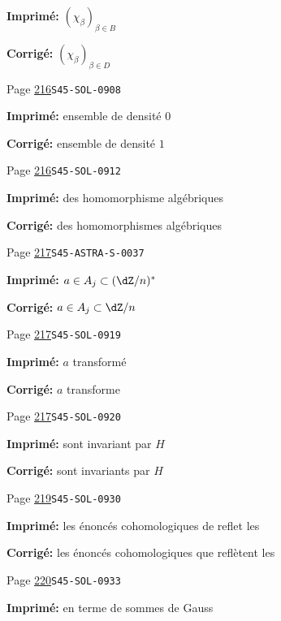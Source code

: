 \documentclass[oneside]{book}
\theoremstyle{sga-source}
\theoremstyle{sga-source-dash}
\theoremstyle{sga-source-dotdash}
\theoremstyle{sga-source-number-note-dash}
\theoremstyle{sga-source-note-number-dotdash}
\theoremstyle{sga-source-example-dotdash}
\theoremstyle{sga-source-inline-number}
\theoremstyle{sga-source-bare-number}
\theoremstyle{sga-source}
\begin{document}
\begin{description}
\par\noindent\textbf{Imprimé:} \((\chi_\beta)_{\beta\in B}\)
\par\noindent\textbf{Corrigé:} \((\chi_\beta)_{\beta\in D}\)
\smallskip
\item[\hypertarget{apparatus:FR-0227}{227}] Page \hyperlink{printpage:fr:216}{216}\quad\texttt{S45-SOL-0908}
\par\noindent\textbf{Imprimé:} ensemble de densité $0$
\par\noindent\textbf{Corrigé:} ensemble de densité $1$
\smallskip
\item[\hypertarget{apparatus:FR-0228}{228}] Page \hyperlink{printpage:fr:216}{216}\quad\texttt{S45-SOL-0912}
\par\noindent\textbf{Imprimé:} des homomorphisme algébriques
\par\noindent\textbf{Corrigé:} des homomorphismes algébriques
\smallskip
\item[\hypertarget{apparatus:FR-0229}{229}] Page \hyperlink{printpage:fr:217}{217}\quad\texttt{S45-ASTRA-S-0037}
\par\noindent\textbf{Imprimé:} $a\in A_j\subset (\dZ/n)^\ast$
\par\noindent\textbf{Corrigé:} $a\in A_j\subset\dZ/n$
\smallskip
\item[\hypertarget{apparatus:FR-0230}{230}] Page \hyperlink{printpage:fr:217}{217}\quad\texttt{S45-SOL-0919}
\par\noindent\textbf{Imprimé:} $a$ transformé
\par\noindent\textbf{Corrigé:} $a$ transforme
\smallskip
\item[\hypertarget{apparatus:FR-0231}{231}] Page \hyperlink{printpage:fr:217}{217}\quad\texttt{S45-SOL-0920}
\par\noindent\textbf{Imprimé:} sont invariant par $H$
\par\noindent\textbf{Corrigé:} sont invariants par $H$
\smallskip
\item[\hypertarget{apparatus:FR-0232}{232}] Page \hyperlink{printpage:fr:219}{219}\quad\texttt{S45-SOL-0930}
\par\noindent\textbf{Imprimé:} les énoncés cohomologiques de reflet les
\par\noindent\textbf{Corrigé:} les énoncés cohomologiques que reflètent les
\smallskip
\item[\hypertarget{apparatus:FR-0233}{233}] Page \hyperlink{printpage:fr:220}{220}\quad\texttt{S45-SOL-0933}
\par\noindent\textbf{Imprimé:} en terme de sommes de Gauss

\end{description}
\end{document}
